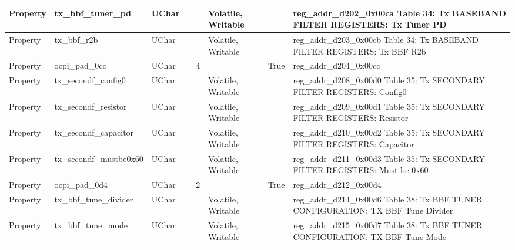 \documentclass{article}
\begin{document}
\begin{scriptsize}
\begin{longtable}{|p{2cm}|p{5cm}|p{1cm}|p{2cm}|p{2cm}|p{1.75cm}|p{1.5cm}|p{5.1cm}|}
  \hline
  Property & tx\_bbf\_tuner\_pd                                       & UChar &                  &                  & Volatile,  Writable &         & reg\_addr\_d202\_0x00ca Table 34: Tx BASEBAND FILTER REGISTERS: Tx Tuner PD \\
  \hline
  Property & tx\_bbf\_r2b                                             & UChar &                  &                  & Volatile,  Writable &         & reg\_addr\_d203\_0x00cb Table 34: Tx BASEBAND FILTER REGISTERS: Tx BBF R2b \\
  \hline
  Property & ocpi\_pad\_0cc                                           & UChar &                  & 4                &                     & True    & reg\_addr\_d204\_0x00cc \\
  \hline
  Property & tx\_secondf\_config0                                     & UChar &                  &                  & Volatile,  Writable &         & reg\_addr\_d208\_0x00d0 Table 35: Tx SECONDARY FILTER REGISTERS: Config0 \\
  \hline
  Property & tx\_secondf\_resistor                                    & UChar &                  &                  & Volatile,  Writable &         & reg\_addr\_d209\_0x00d1 Table 35: Tx SECONDARY FILTER REGISTERS: Resistor \\
  \hline
  Property & tx\_secondf\_capacitor                                   & UChar &                  &                  & Volatile,  Writable &         & reg\_addr\_d210\_0x00d2 Table 35: Tx SECONDARY FILTER REGISTERS: Capacitor \\
  \hline
  Property & tx\_secondf\_mustbe0x60                                  & UChar &                  &                  & Volatile,  Writable &         & reg\_addr\_d211\_0x00d3 Table 35: Tx SECONDARY FILTER REGISTERS: Must be 0x60 \\
  \hline
  Property & ocpi\_pad\_0d4                                           & UChar &                  & 2                &                     & True    & reg\_addr\_d212\_0x00d4 \\
  \hline
  Property & tx\_bbf\_tune\_divider                                   & UChar &                  &                  & Volatile,  Writable &         & reg\_addr\_d214\_0x00d6 Table 38: Tx BBF TUNER CONFIGURATION: TX BBF Tune Divider \\
  \hline
  Property & tx\_bbf\_tune\_mode                                      & UChar &                  &                  & Volatile,  Writable &         & reg\_addr\_d215\_0x00d7 Table 38: Tx BBF TUNER CONFIGURATION: TX BBF Tune Mode \\

\end{longtable}
\end{scriptsize}
\end{document}
